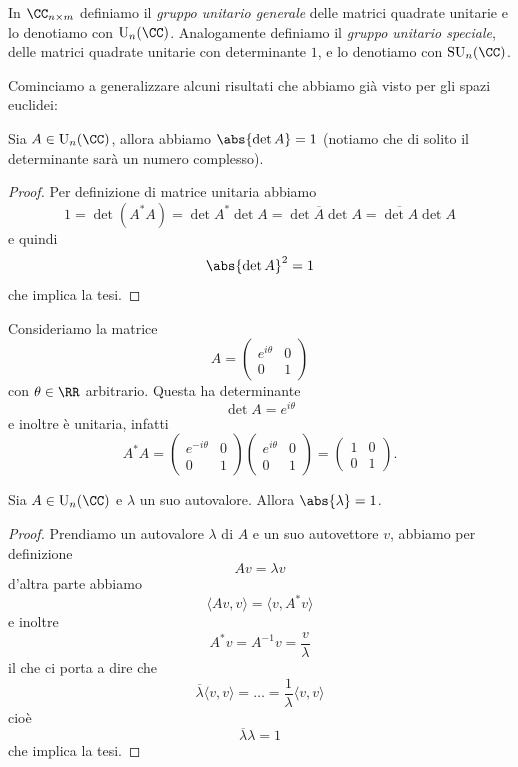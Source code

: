 \documentclass[11pt]{scrartcl}
\begin{document}
   	 \begin{definition}
   	 	In $\CC_{n\times m}$ definiamo il \textit{gruppo unitario generale} delle matrici quadrate unitarie e lo denotiamo con $\text{U}_n(\CC)$. Analogamente definiamo il \textit{gruppo unitario speciale}, delle matrici quadrate unitarie con determinante $1$, e lo denotiamo con $\text{SU}_n(\CC)$.
   	 \end{definition}
   	 Cominciamo a generalizzare alcuni risultati che abbiamo già visto per gli spazi euclidei:
   	 \begin{lemma}
   	 	Sia $A\in \text{U}_n(\CC)$, allora abbiamo $\abs{\det A}=1$ (notiamo che di solito il determinante sarà un numero complesso).
   	 \end{lemma}
   	 \begin{proof}
   	 	Per definizione di matrice unitaria abbiamo
   	 	$$1=\det\left(A^* A\right)=\det A^* \det A=\det\overline{A}\det A=\overline{\det A}\det A$$
   	 	e quindi 
   	 	$$\abs{\det A}^2=1$$
   	 	che implica la tesi.
   	 \end{proof}
   	 \begin{example}
   	 	Consideriamo la matrice
   	 	$$A=\begin{pmatrix}
   	 		e^{i\theta} & 0 \\
   	 		0 & 1
   	 	\end{pmatrix}$$
   	 	con $\theta\in\RR$ arbitrario. Questa ha determinante
   	 	$$\det A=e^{i\theta}$$
   	 	e inoltre è unitaria, infatti
   	 	$$A^*A=\begin{pmatrix}
   	 		e^{-i\theta} & 0 \\
   	 		0 & 1
   	 	\end{pmatrix}
   	 	\begin{pmatrix}
   	 		e^{i\theta} & 0 \\
   	 		0 & 1
   	 	\end{pmatrix}
   	 	=
   	 	\begin{pmatrix}
   	 		1 & 0 \\
   	 		0 & 1
   	 	\end{pmatrix}.
   	 	$$
   	 \end{example}
   	 \begin{lemma}
   	 	Sia $A\in \text{U}_n(\CC)$ e $\lambda$ un suo autovalore. Allora $\abs{\lambda}=1$.
   	 \end{lemma}
   	 \begin{proof}
   	 	Prendiamo un autovalore $\lambda$ di $A$ e un suo autovettore $v$, abbiamo per definizione
   	 	$$Av=\lambda v$$
   	 	d'altra parte abbiamo
   	 	$$\langle Av,v \rangle = \langle v,A^*v\rangle$$
   	 	e inoltre
   	 	$$A^*v=A^{-1}v=\frac{v}{\lambda}$$
   	 	il che ci porta a dire che 
   	 	$$\overline{\lambda}\langle v,v\rangle=\dots=\frac{1}{\lambda}\langle v,v\rangle$$
   	 	cioè
   	 	$$\overline{\lambda}\lambda=1$$
   	 	che implica la tesi.
   	 \end{proof}
\end{document}
